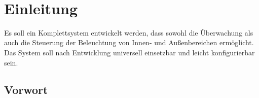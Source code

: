 \documentclass[12pt,a4paper]{scrreprt}
\begin{document}
\begin{figure}
 \\
\end{figure}
\thispagestyle{empty} %
 \tableofcontents
\thispagestyle{empty} 
\chapter{Einleitung}
Es soll ein Komplettsystem entwickelt werden, dass sowohl die Überwachung als auch die Steuerung der Beleuchtung von Innen- und Außenbereichen ermöglicht. Das System soll nach Entwicklung universell einsetzbar und leicht konfigurierbar sein. 
\section{Vorwort}
\end{document}
